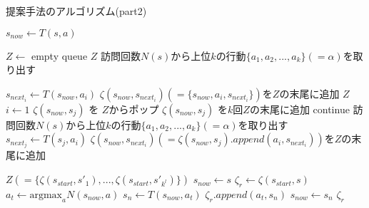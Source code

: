 \begin{algorithm}
    
    \caption{提案手法のアルゴリズム(part2)}
    \label{alg:myalg-2}
    \begin{algorithmic}[1]    
    \scriptsize   
           \State $s_{now} \gets T(s, a)$
           
           \State $Z \gets $ empty queue
             \Return  $Z$
            \EndIf
           \State 訪問回数$N(s)$から上位$k$の行動$\{a_1, a_2, ..., a_{k}\}(=\alpha)$を取り出す
             
             \State $s_{{next}_i} \gets T(s_{now}, a_i)$
             \State $\zeta(s_{now},s_{{next}_i})(=\{s_{now}, a_i, s_{{next}_i}\})$を$Z$の末尾に追加
           \EndFor
             \Return $Z$
           \EndIf
           \State $i \gets 1$
                    \State $\zeta(s_{now}, s_{j})$ を $Z$からポップ
                        \State $\zeta(s_{now}, s_{j})$ を$k$回$Z$の末尾に追加
                        \State continue
                    \EndIf
                    \State 訪問回数$N(s)$から上位$k$の行動$\{a_1, a_2, ..., a_{k}\}(=\alpha)$を取り出す
                        \State $s_{{next}_j} \gets T(s_{j}, a_i)$
                        \State $\zeta(s_{now},s_{{next}_i})(=\zeta(s_{now}, s_{j}).append({a_i, s_{{next}_i}}))$を$Z$の末尾に追加
                    \EndFor
                    
                \EndFor     
           \EndWhile
           \Return $Z(=\{\zeta(s_{start}, {s'}_1), ..., \zeta(s_{start}, {s'}_{k^l})\})$
        \EndFunction
        \State $s_{now} \gets s$
        \State $\zeta_r \gets \zeta(s_{start}, s)$
            \State $a_t \gets \textrm{argmax}_a N(s_{now}, a)$
            \State $s_n \gets T(s_{now}, a_t)$
            \State $\zeta_r.append({a_t, s_n})$
            \State $s_{now} \gets s_n$
        \EndWhile
        \Return $\zeta_r$
        \EndFunction
       
        
    \end{algorithmic}
\end{algorithm}

